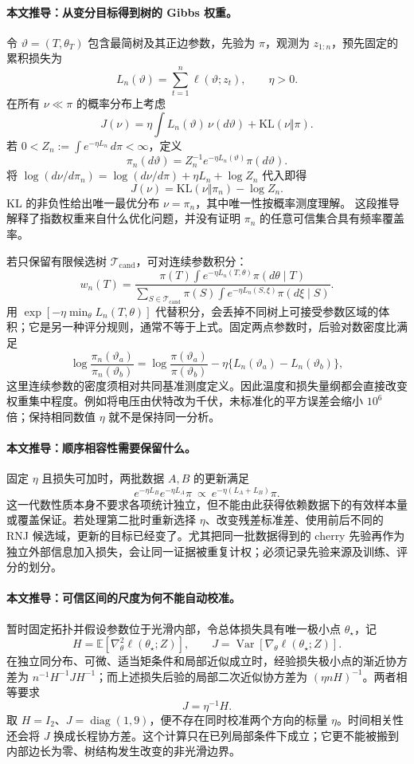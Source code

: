 \documentclass[UTF8,11pt,fontset=fandol]{ctexart}
\theoremstyle{remark}
\numberwithin{equation}{section}
\begin{document}
\paragraph{本文推导：从变分目标得到树的 Gibbs 权重。}
令 $\vartheta=(T,\theta_T)$ 包含最简树及其正边参数，先验为 $\pi$，观测为 $z_{1:n}$，预先固定的累积损失为
\[
 L_n(\vartheta)=\sum_{t=1}^n\ell(\vartheta;z_t),\qquad \eta>0.
\]
在所有 $\nu\ll\pi$ 的概率分布上考虑
\[
 J(\nu)=\eta\int L_n(\vartheta)\,\nu(d\vartheta)
       +\mathrm{KL}(\nu\Vert\pi).
\]
若 $0<Z_n:=\int e^{-\eta L_n}\,d\pi<\infty$，定义
\[
 \pi_n(d\vartheta)=Z_n^{-1}e^{-\eta L_n(\vartheta)}\pi(d\vartheta).
\]
将 $\log(d\nu/d\pi_n)=\log(d\nu/d\pi)+\eta L_n+\log Z_n$
代入即得
\[
 J(\nu)=\mathrm{KL}(\nu\Vert\pi_n)-\log Z_n.
\]
KL 的非负性给出唯一最优分布 $\nu=\pi_n$，其中唯一性按概率测度理解。
这段推导解释了指数权重来自什么优化问题，并没有证明 $\pi_n$ 的任意可信集合具有频率覆盖率。

若只保留有限候选树 $\mathcal T_{\mathrm{cand}}$，可对连续参数积分：
\[
 w_n(T)=
 \frac{\pi(T)\int e^{-\eta L_n(T,\theta)}\pi(d\theta\mid T)}
 {\sum_{S\in\mathcal T_{\mathrm{cand}}}\pi(S)
       \int e^{-\eta L_n(S,\xi)}\pi(d\xi\mid S)}.
\]
用 $\exp[-\eta\min_\theta L_n(T,\theta)]$ 代替积分，会丢掉不同树上可接受参数区域的体积；它是另一种评分规则，通常不等于上式。固定两点参数时，后验对数密度比满足
\[
 \log\frac{\pi_n(\vartheta_a)}{\pi_n(\vartheta_b)}
 =\log\frac{\pi(\vartheta_a)}{\pi(\vartheta_b)}
  -\eta\{L_n(\vartheta_a)-L_n(\vartheta_b)\},
\]
这里连续参数的密度须相对共同基准测度定义。因此温度和损失量纲都会直接改变权重集中程度。例如将电压由伏特改为千伏，未标准化的平方误差会缩小 $10^6$ 倍；保持相同数值 $\eta$ 就不是保持同一分析。

\paragraph{本文推导：顺序相容性需要保留什么。}
固定 $\eta$ 且损失可加时，两批数据 $A,B$ 的更新满足
\[
 e^{-\eta L_B}e^{-\eta L_A}\pi
 \ \propto\ e^{-\eta(L_A+L_B)}\pi.
\]
这一代数性质本身不要求各项统计独立，但不能由此获得依赖数据下的有效样本量或覆盖保证。若处理第二批时重新选择 $\eta$、改变残差标准差、使用前后不同的 RNJ 候选域，更新的目标已经变了。尤其把同一批数据得到的 cherry 先验再作为独立外部信息加入损失，会让同一证据被重复计权；必须记录先验来源及训练、评分的划分。

\paragraph{本文推导：可信区间的尺度为何不能自动校准。}
暂时固定拓扑并假设参数位于光滑内部，令总体损失具有唯一极小点 $\theta_\star$，记
\[
 H=\mathbb E[\nabla^2_\theta\ell(\theta_\star;Z)],\qquad
 J=\operatorname{Var}[\nabla_\theta\ell(\theta_\star;Z)].
\]
在独立同分布、可微、适当矩条件和局部近似成立时，经验损失极小点的渐近协方差为
$n^{-1}H^{-1}JH^{-1}$；而上述损失后验的局部二次近似协方差为
$(\eta nH)^{-1}$。两者相等要求
\[
 J=\eta^{-1}H.
\]
取 $H=I_2$、$J=\operatorname{diag}(1,9)$，便不存在同时校准两个方向的标量 $\eta$。时间相关性还会将 $J$ 换成长程协方差。这个计算只在已列局部条件下成立；它更不能被搬到内部边长为零、树结构发生改变的非光滑边界。
\end{document}
